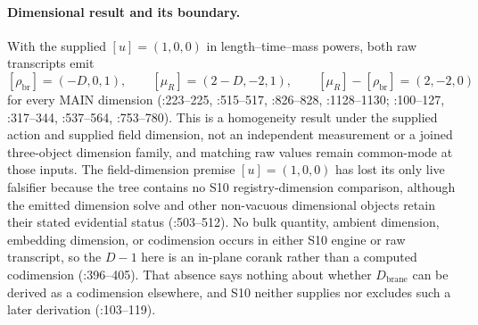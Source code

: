 \paragraph{Dimensional result and its boundary.}
With the supplied \([u]=(1,0,0)\) in length--time--mass powers, both raw
transcripts emit
\[
 [\rho_{\mathrm{br}}]=(-D,0,1),\qquad
 [\mu_R]=(2-D,-2,1),\qquad
 [\mu_R]-[\rho_{\mathrm{br}}]=(2,-2,0)
\]
for every MAIN dimension
(:223--225,
:515--517, :826--828, :1128--1130;
:100--127,
:317--344, :537--564, :753--780).
This is a homogeneity result under the supplied action and supplied field
dimension, not an independent measurement or a joined three-object dimension
family, and matching raw values remain common-mode at those inputs.
The field-dimension premise \([u]=(1,0,0)\) has lost its only live falsifier
because the tree contains no S10 registry-dimension comparison, although the
emitted dimension solve and other non-vacuous dimensional objects retain their
stated evidential status
(:503--512).
No bulk quantity, ambient dimension, embedding dimension, or codimension occurs
in either S10 engine or raw transcript, so the \(D-1\) here is an in-plane
corank rather than a computed codimension
(:396--405).
That absence says nothing about whether \(D_{\mathrm{brane}}\) can be derived as
a codimension elsewhere, and S10 neither supplies nor excludes such a later
derivation
(:103--119).

